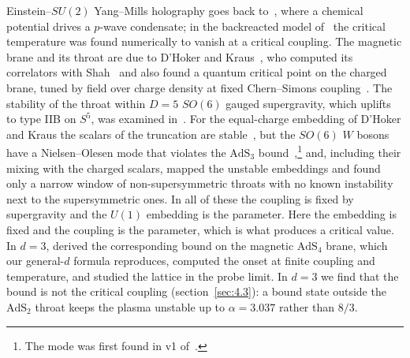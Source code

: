 Einstein--$SU(2)$ Yang--Mills holography goes back
to~\cite{Gubser:2008zu,Gubser:2008wv}, where a chemical potential drives a
$p$-wave condensate; in the backreacted model of~\cite{Gubser:2008zu} the
critical temperature was found numerically to vanish at a critical
coupling. The magnetic brane and its throat are due to D'Hoker and
Kraus~\cite{DHoker:2009mmn,DHoker:2012rlj}, who computed its correlators
with Shah~\cite{DHoker:2010xwl} and also found a
quantum critical point on the charged brane, tuned by field over charge
density at fixed Chern--Simons coupling~\cite{DHoker:2010zpp,DHoker:2010onp}.
The stability of the throat within $D = 5$ $SO(6)$ gauged supergravity,
which uplifts to type IIB on $S^5$, was examined
in~\cite{Almuhairi:2010rb,Almuhairi:2011ws,Donos:2011pn}. For the
equal-charge embedding of D'Hoker and Kraus the scalars of the truncation
are stable~\cite{Almuhairi:2010rb}, but the $SO(6)$ $W$ bosons have a
Nielsen--Olesen mode that violates the $\mathrm{AdS}_3$
bound~\cite{Donos:2011pn},\footnote{The mode was first found in v1
of~\cite{Almuhairi:2011ws}.} and, including their mixing with
the charged scalars, \cite{Donos:2011pn} mapped the unstable embeddings and
found only a narrow window of non-supersymmetric throats with no known
instability next to the supersymmetric ones. In all of these
the coupling is fixed by supergravity and the $U(1)$ embedding is the
parameter. Here the embedding is fixed and the coupling is the parameter,
which is what produces a critical value. In $d = 3$,
\cite{Wong:2013rda} derived the corresponding bound on the magnetic
$\mathrm{AdS}_4$ brane, which our general-$d$ formula reproduces, computed
the onset at finite coupling and temperature, and studied the lattice in
the probe limit. In $d = 3$ we find that the bound is not the critical
coupling (section~\ref{sec:4.3}): a bound state outside the $\mathrm{AdS}_2$
throat keeps the plasma unstable up to $\alpha = 3.037$ rather than $8/3$.

